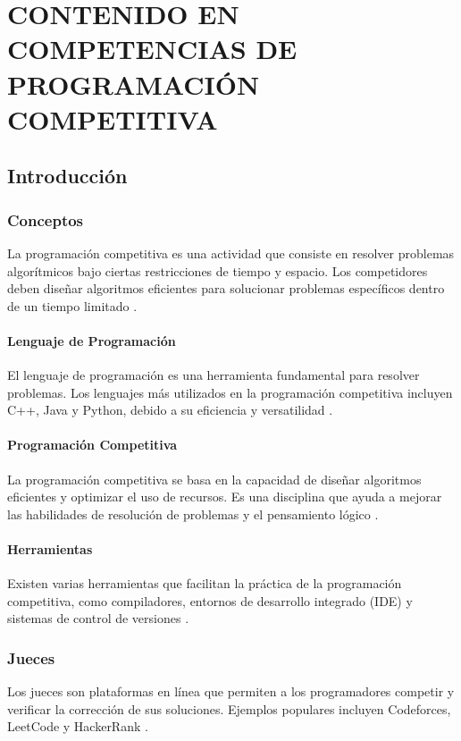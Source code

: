 \section{CONTENIDO EN COMPETENCIAS DE PROGRAMACIÓN COMPETITIVA}
\subsection{Introducción}
\subsubsection{Conceptos}
La programación competitiva es una actividad que consiste en resolver problemas algorítmicos bajo ciertas restricciones de tiempo y espacio. Los competidores deben diseñar algoritmos eficientes para solucionar problemas específicos dentro de un tiempo limitado \cite{skiena2008algorithm}.
\paragraph{Lenguaje de Programación}
El lenguaje de programación es una herramienta fundamental para resolver problemas. Los lenguajes más utilizados en la programación competitiva incluyen C++, Java y Python, debido a su eficiencia y versatilidad \cite{stroustrup2013c++}.
\paragraph{Programación Competitiva}
La programación competitiva se basa en la capacidad de diseñar algoritmos eficientes y optimizar el uso de recursos. Es una disciplina que ayuda a mejorar las habilidades de resolución de problemas y el pensamiento lógico \cite{ahmed2020competitive}.
\paragraph{Herramientas}
Existen varias herramientas que facilitan la práctica de la programación competitiva, como compiladores, entornos de desarrollo integrado (IDE) y sistemas de control de versiones \cite{menezes2018tools}.

\subsubsection{Jueces}
Los jueces son plataformas en línea que permiten a los programadores competir y verificar la corrección de sus soluciones. Ejemplos populares incluyen Codeforces, LeetCode y HackerRank \cite{leon2017online}.

